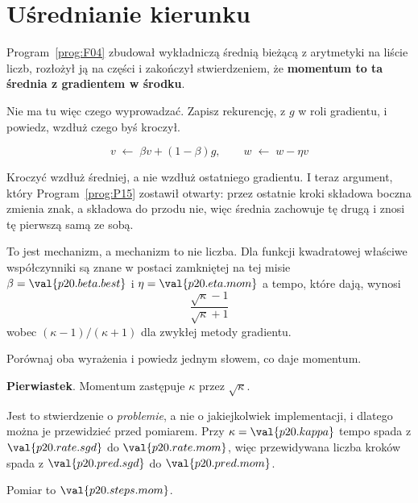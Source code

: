 \section{Uśrednianie kierunku}
\label{sec:P20-momentum}

\begin{fr}
Program~\ref{prog:F04} zbudował wykładniczą średnią bieżącą z arytmetyki na
liście liczb, rozłożył ją na części i zakończył stwierdzeniem, że
\textbf{momentum to ta średnia z gradientem w środku}.

Nie ma tu więc czego wyprowadzać. Zapisz rekurencję, z $g$ w roli gradientu, i
powiedz, wzdłuż czego byś kroczył.
\dotline
\nextframe
\end{fr}

\begin{fr}
\begin{ansblock}
\[ v \;\leftarrow\; \beta v + (1-\beta) g, \qquad
   w \;\leftarrow\; w - \eta v \]
\end{ansblock}

Kroczyć wzdłuż średniej, a nie wzdłuż ostatniego gradientu. I teraz argument,
który Program~\ref{prog:P15} zostawił otwarty: przez ostatnie kroki składowa
boczna zmienia znak, a składowa do przodu nie, więc średnia zachowuje tę drugą
i znosi tę pierwszą samą ze sobą.

\end{fr}

\begin{fr}
To jest mechanizm, a mechanizm to nie liczba. Dla funkcji kwadratowej właściwe
współczynniki są znane w postaci zamkniętej \dash{} na tej misie
$\beta = \val{p20.beta.best}$ i $\eta = \val{p20.eta.mom}$ \dash{} a tempo,
które dają, wynosi
\[ \frac{\sqrt{\kappa} - 1}{\sqrt{\kappa} + 1} \]
wobec $(\kappa-1)/(\kappa+1)$ dla zwykłej metody gradientu.

Porównaj oba wyrażenia i powiedz jednym słowem, co daje momentum.
\nextframe
\end{fr}

\begin{fr}
\begin{ansblock}
\textbf{Pierwiastek}. Momentum zastępuje $\kappa$ przez $\sqrt{\kappa}$.
\end{ansblock}

Jest to stwierdzenie o \emph{problemie}, a nie o jakiejkolwiek implementacji, i
dlatego można je przewidzieć przed pomiarem. Przy
$\kappa = \val{p20.kappa}$ tempo spada z $\val{p20.rate.sgd}$ do
$\val{p20.rate.mom}$, więc przewidywana liczba kroków spada z
$\val{p20.pred.sgd}$ do $\val{p20.pred.mom}$.

Pomiar to $\val{p20.steps.mom}$.
\end{fr}


